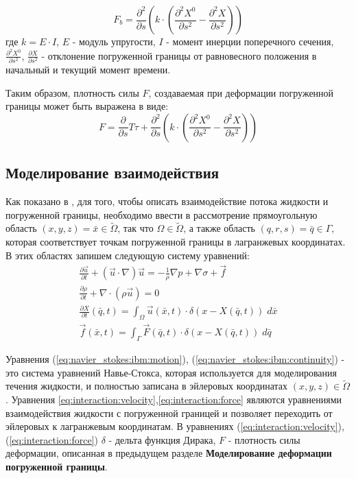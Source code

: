 \begin{equation}
    F_b = \frac{\partial^2}{\partial s} \left( k \cdot \left(\frac{\partial^2 X^0}{\partial s^2} - \frac{\partial^2 X}{\partial s^2} \right) \right)
\end{equation}
где $k = E \cdot I$, $E$ - модуль упругости, $I$ - момент инерции поперечного сечения, $\frac{\partial^2 X^0}{\partial s^2}$, $\frac{\partial X}{\partial s^2}$ -
отклонение погруженной границы от равновесного положения в начальный и текущий момент времени.

Таким образом, плотность силы $F$, создаваемая при деформации погруженной границы может быть выражена в виде:
\begin{equation}
    F = \frac{\partial}{\partial s} T \tau + \frac{\partial^2}{\partial s} \left( k \cdot \left(\frac{\partial^2 X^0}{\partial s^2} - \frac{\partial^2 X}{\partial s^2} \right) \right)
\end{equation}

\subsection*{Моделирование взаимодействия}
Как показано в \cite{peskin2002immersed}, для того, чтобы описать взаимодействие потока жидкости и погруженной границы,
необходимо ввести в рассмотрение прямоугольную область $(x, y, z) = \bar{x} \in \tilde{\Omega}$, так что $\Omega \in \tilde{\Omega}$, а также
область $(q, r, s) = \bar{q} \in \Gamma$, которая соответствует точкам погруженной границы в лагранжевых координатах.
В этих областях запишем следующую систему уравнений:
\begin{gather}
    \label{eq:navier_stokes:ibm:motion}
    \frac{\partial \vec{u}}{\partial t} + (\vec{u} \cdot \nabla) \vec{u} = - \frac{1}{\rho} \nabla p + \nabla \sigma + \vec{f}\\
    \label{eq:navier_stokes:ibm:continuity}
    \frac{\partial \rho}{\partial t} + \nabla \cdot (\rho \vec{u}) = 0\\
    \label{eq:interaction:velocity}
    \frac{\partial X}{\partial t}(\bar{q}, t) = \int_{\Omega} \vec{u}(\bar{x}, t) \cdot \delta (x - X(\bar{q}, t))\; d\bar{x}\\
    \label{eq:interaction:force}
    \vec{f}(\bar{x}, t) = \int_{\Gamma} \vec{F}(\bar{q}, t) \cdot \delta (x - X(\bar{q}, t))\; d\bar{q}
\end{gather}

Уравнения (\ref{eq:navier_stokes:ibm:motion}), (\ref{eq:navier_stokes:ibm:continuity}) - это система уравнений Навье-Стокса,
которая используется для моделирования течения жидкости, и полностью записана в эйлеровых координатах $(x, y, z) \in \tilde{\Omega}$.
Уравнения \ref{eq:interaction:velocity},\ref{eq:interaction:force} являются уравнениями взаимодействия жидкости с погруженной границей
и позволяет переходить от эйлеровых к лагранжевым координатам. В уравнениях (\ref{eq:interaction:velocity}), (\ref{eq:interaction:force})
$\delta$ - дельта функция Дирака, $F$ - плотность силы деформации, описанная в предыдущем разделе \textbf{Моделирование деформации погруженной границы}.

